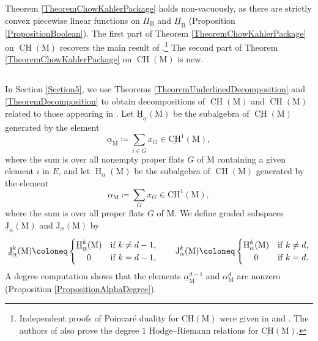 \documentclass[11pt,reqno]{amsart}
\theoremstyle{definition}
\newtheorem{definition}[theorem]{Definition}
\theoremstyle{remark}
\renewcommand{\H}{\operatorname{H}}
\renewcommand{\(}{\left(}
\renewcommand{\)}{\right)}
\newcommand{\<}{\left<}
\renewcommand{\>}{\right>}
\newcommand{\CH}{\operatorname{CH}}
\newcommand{\uCH}{\underline{\CH}}
\newcommand{\J}{\operatorname{J}}
\begin{document}
 Theorem \ref{TheoremChowKahlerPackage} holds non-vacuously, as
  there are strictly convex piecewise linear functions on $\Pi_\mathrm{B}$ and $\underline{\Pi}_\mathrm{B}$ (Proposition \ref{PropositionBoolean}).
The first part of Theorem \ref{TheoremChowKahlerPackage} on $\uCH(\mathrm{M})$ recovers the main result of \cite{AHK}.\footnote{Independent proofs of Poincar\'e duality  for $\underline{\mathrm{CH}}(\mathrm{M})$ were  given in  \cite{BES} and \cite{BDF}. The authors of \cite{BES} also prove the degree $1$ Hodge--Riemann relations for $\underline{\mathrm{CH}}(\mathrm{M})$.}
The second part of Theorem  \ref{TheoremChowKahlerPackage} on $\CH(\mathrm{M})$ is new. 


\subsection{} 
In Section \ref{Section5},  we use Theorems \ref{TheoremUnderlinedDecomposition} and \ref{TheoremDecomposition}
to obtain decompositions of $\underline{\CH}(\mathrm{M})$ and $\CH(\mathrm{M})$ related to those appearing in \cite[Theorem 6.18]{AHK}.
Let $\underline{\mathrm{H}}_{\underline{\alpha}}(\mathrm{M})$ be the subalgebra of $\uCH(\mathrm{M})$ generated by the element
\[
\underline{\alpha}_{\mathrm{M}}\coloneq  \sum_{i \in G} x_G \in \underline{\mathrm{CH}}^1(\mathrm{M}),
\]
where the sum is over all nonempty proper flats $G$ of $\mathrm{M}$ containing a given element $i$ in $E$,
and let $\H_\alpha(\mathrm{M})$ be the subalgebra of $\CH(\mathrm{M})$ generated by the element
\[
\alpha_{\mathrm{M}} \coloneq \sum_G x_G \in \mathrm{CH}^1(\mathrm{M}),
\]
where the sum is over all proper flats $G$ of $\mathrm{M}$.
We define graded subspaces $\underline{\mathrm{J}}_{\underline{\alpha}}(\mathrm{M})$ and $\mathrm{J}_\alpha(\mathrm{M})$ by %
\[
\underline{\mathrm{J}}_{\underline{\alpha}}^k(\mathrm{M})\coloneq \begin{cases} \underline{\mathrm{H}}_{\underline{\alpha}}^k(\mathrm{M}) & \text{if $k \neq d-1$,} \\ \hfil 0 & \text{if $k=d-1$,} \end{cases}
\qquad
\mathrm{J}_\alpha^k(\mathrm{M}) \coloneq \begin{cases} \H_\alpha^k(\mathrm{M}) & \text{if $k \neq d$,} \\ \hfil 0 & \text{if $k=d$.} \end{cases}
\]
A degree computation shows that the elements $\underline{\alpha}_\mathrm{M}^{d-1}$ and 
 $\alpha_\mathrm{M}^d$ are nonzero (Proposition \ref{PropositionAlphaDegree}).
\end{document}
